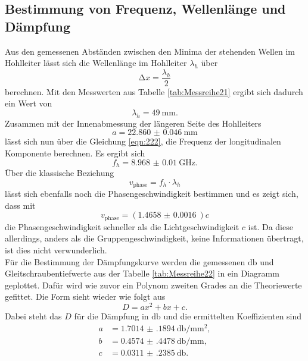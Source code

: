 \subsection{Bestimmung von Frequenz, Wellenlänge und Dämpfung}

Aus den gemessenen Abständen zwischen den Minima der stehenden Wellen im Hohlleiter lässt sich die Wellenlänge im Hohlleiter $\lambda_h$ über
\begin{equation}
\increment x = \frac{\lambda_h}{2}
\end{equation}
berechnen. Mit den Messwerten aus Tabelle \ref{tab:Messreihe21} ergibt sich dadurch ein Wert von
\begin{equation}
\lambda_h = \SI{49}{\milli\meter}.
\end{equation}
Zusammen mit der Innenabmessung der längeren Seite des Hohlleiters
\begin{equation}
a = \SI{22.860(46)}{\milli\meter}
\end{equation}
lässt sich nun über die Gleichung \ref{eqn:222}, die Frequenz der longitudinalen Komponente berechnen.
Es ergibt sich 
\begin{equation}
f_h = \SI{8.968(10)}{\giga\hertz}.
\end{equation}
Über die klassische Beziehung 
\begin{equation}
v_{\text{phase}} = f_h \cdot \lambda_h
\end{equation}
lässt sich ebenfalls noch die Phasengeschwindigkeit bestimmen und es zeigt sich, dass mit 
\begin{equation}
v_{\text{phase}} = \left(\SI{1.4658(16)}{}\right) c
\end{equation}
die Phasengeschwindigkeit schneller als die Lichtgeschwindigkeit $c$ ist. Da diese allerdings, anders als die Gruppengeschwindigkeit, keine Informationen übertragt, ist dies nicht verwunderlich.
\\
\newline
Für die Bestimmung der Dämpfungskurve werden die gemessenen $\si{\decibel}$ und Gleitschraubentiefwerte aus der Tabelle \ref{tab:Messreihe22} in ein Diagramm geplottet.
Dafür wird wie zuvor ein Polynom zweiten Grades an die Theoriewerte gefittet. Die Form sieht wieder wie folgt aus
\begin{equation}
D = ax^2 + bx + c.
\end{equation}
Dabei steht das $D$ für die Dämpfung in $\si{\decibel}$ und die ermittelten Koeffizienten sind
\begin{align*}
a &= \SI{1.7014(1894)}{\decibel\per\milli\meter\squared}, \\
b &= \SI{0.4574(4478)}{\decibel\per\milli\meter}, \\
c &= \SI{0.0311(2385)}{\decibel}.
\end{align*}
